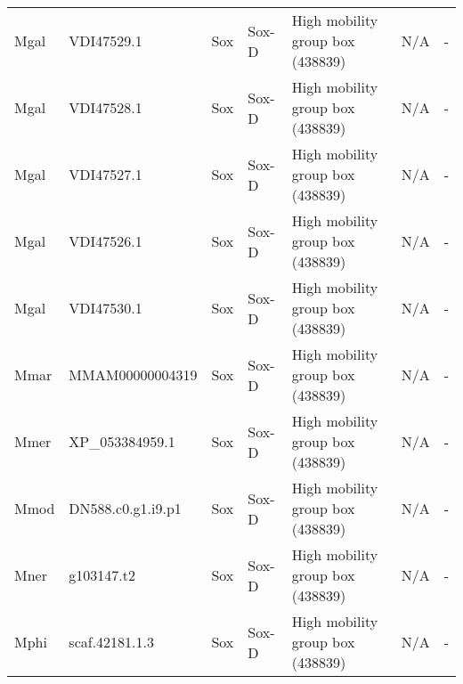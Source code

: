 \documentclass[../main.tex]{subfiles}
\begin{document}
\begin{landscape}
\begin{longtable}{lllllll}
		Mgal           & VDI47529.1            & Sox            & Sox-D               & High mobility group box (438839)            & N/A                                                                    & -                    \\
		Mgal           & VDI47528.1            & Sox            & Sox-D               & High mobility group box (438839)            & N/A                                                                    & -                    \\
		Mgal           & VDI47527.1            & Sox            & Sox-D               & High mobility group box (438839)            & N/A                                                                    & -                    \\
		Mgal           & VDI47526.1            & Sox            & Sox-D               & High mobility group box (438839)            & N/A                                                                    & -                    \\
		Mgal           & VDI47530.1            & Sox            & Sox-D               & High mobility group box (438839)            & N/A                                                                    & -                    \\
		Mmar           & MMAM00000004319       & Sox            & Sox-D               & High mobility group box (438839)            & N/A                                                                    & -                    \\
		Mmer           & XP\_053384959.1       & Sox            & Sox-D               & High mobility group box (438839)            & N/A                                                                    & -                    \\
		Mmod           & DN588.c0.g1.i9.p1     & Sox            & Sox-D               & High mobility group box (438839)            & N/A                                                                    & -                    \\
		Mner           & g103147.t2            & Sox            & Sox-D               & High mobility group box (438839)            & N/A                                                                    & -                    \\
		Mphi           & scaf.42181.1.3        & Sox            & Sox-D               & High mobility group box (438839)            & N/A                                                                    & -                    \\

\end{longtable}
\end{landscape}
\end{document}
